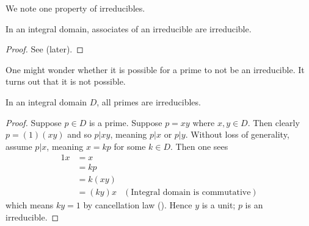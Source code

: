 We note one property of irreducibles.
\begin{proposition}\label{prop-associates-of-irreducible-is-irreducible}
    In an integral domain, associates of an irreducible are irreducible.
\end{proposition}
\begin{proof}
    See  (later).
\end{proof}

One might wonder whether it is possible for a prime to not be an irreducible. It turns out that it is not possible.
\begin{theorem}\label{thrm-in-integral-domain-primes-are-irreducibles}
    In an integral domain $D$, all primes are irreducibles.
\end{theorem}
\begin{proof}
    Suppose $p \in D$ is a prime. Suppose $p = xy$ where $x, y\in D$. Then clearly $p = (1)(xy)$ and so $p \vert xy$, meaning $p \vert x$ or $p \vert y$. Without loss of generality, assume $p \vert x$, meaning $x = kp$ for some $k \in D$. Then one sees
    \begin{align*}
        1x &= x\\
        &= kp\\
        &= k(xy)\\
        &= (ky)x & (\text{Integral domain is commutative})
    \end{align*}
    which means $ky = 1$ by cancellation law (). Hence $y$ is a unit; $p$ is an irreducible.
\end{proof}

